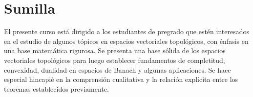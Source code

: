 \section{Sumilla}

El presente curso está dirigido a los estudiantes de pregrado que
estén interesados en el estudio de algunos tópicos en espacios
vectoriales topológicos, con énfasis en una base matemática rigurosa.
Se presenta una base sólida de los espacios vectoriales topológicos
para luego establecer fundamentos de completitud, convexidad,
dualidad en espacios de Banach y algunas aplicaciones.
Se hace especial hincapié en la comprensión cualitativa y la
relación explícita entre los teoremas establecidos previamente.


